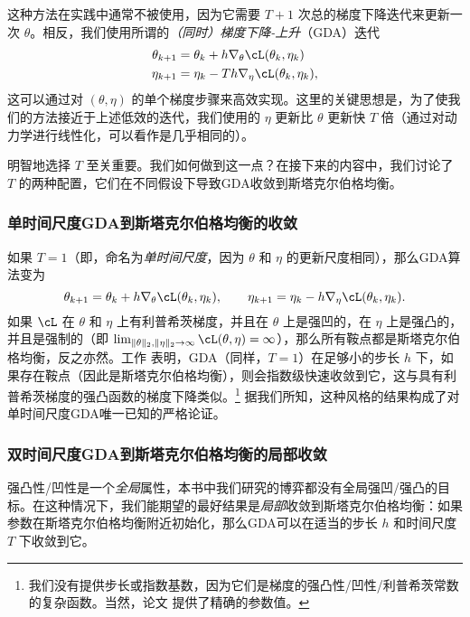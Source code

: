 \documentclass[../../book-main.tex]{subfiles}
\begin{document}
这种方法在实践中通常不被使用，因为它需要 \(T + 1\) 次总的梯度下降迭代来更新一次 \(\theta\)。相反，我们使用所谓的\textit{（同时）梯度下降-上升}（GDA）迭代
\begin{align}
    \theta_{k + 1}
    &= \theta_{k} + h\nabla_{\theta}\cL(\theta_{k}, \eta_{k}) \\ 
    \eta_{k + 1}
    &= \eta_{k} - Th\nabla_{\eta}\cL(\theta_{k}, \eta_{k}),
\end{align}
这可以通过对 \((\theta, \eta)\) 的单个梯度步骤来高效实现。这里的关键思想是，为了使我们的方法接近于上述低效的迭代，我们使用的 \(\eta\) 更新比 \(\theta\) 更新快 \(T\) 倍（通过对动力学进行线性化，可以看作是几乎相同的）。

明智地选择 \(T\) 至关重要。我们如何做到这一点？在接下来的内容中，我们讨论了 \(T\) 的两种配置，它们在不同假设下导致GDA收敛到斯塔克尔伯格均衡。

\subsubsection{单时间尺度GDA到斯塔克尔伯格均衡的收敛}

如果 \(T = 1\)（即，命名为\textit{单时间尺度}，因为 \(\theta\) 和 \(\eta\) 的更新尺度相同），那么GDA算法变为
\begin{equation}
    \theta_{k + 1} = \theta_{k} + h\nabla_{\theta}\cL(\theta_{k}, \eta_{k}), \qquad \eta_{k + 1} = \eta_{k} - h\nabla_{\eta}\cL(\theta_{k}, \eta_{k}).
\end{equation}
如果 \(\cL\) 在 \(\theta\) 和 \(\eta\) 上有利普希茨梯度，并且在 \(\theta\) 上是强凹的，在 \(\eta\) 上是强凸的，并且是强制的（即 \(\lim_{\norm{\theta}_{2}, \norm{\eta}_{2} \to \infty}\cL(\theta, \eta) = \infty\)），那么所有鞍点都是斯塔克尔伯格均衡，反之亦然。工作 \cite{zamani2024convergence} 表明，GDA（同样，\(T = 1\)）在足够小的步长 \(h\) 下，如果存在鞍点（因此是斯塔克尔伯格均衡），则会指数级快速收敛到它，这与具有利普希茨梯度的强凸函数的梯度下降类似。\footnote{我们没有提供步长或指数基数，因为它们是梯度的强凸性/凹性/利普希茨常数的复杂函数。当然，论文 \cite{zamani2024convergence} 提供了精确的参数值。} 据我们所知，这种风格的结果构成了对单时间尺度GDA唯一已知的严格论证。

\subsubsection{双时间尺度GDA到斯塔克尔伯格均衡的局部收敛}

强凸性/凹性是一个\textit{全局}属性，本书中我们研究的博弈都没有全局强凹/强凸的目标。在这种情况下，我们能期望的最好结果是\textit{局部}收敛到斯塔克尔伯格均衡：如果参数在斯塔克尔伯格均衡附近初始化，那么GDA可以在适当的步长 \(h\) 和时间尺度 \(T\) 下收敛到它。
\end{document}
